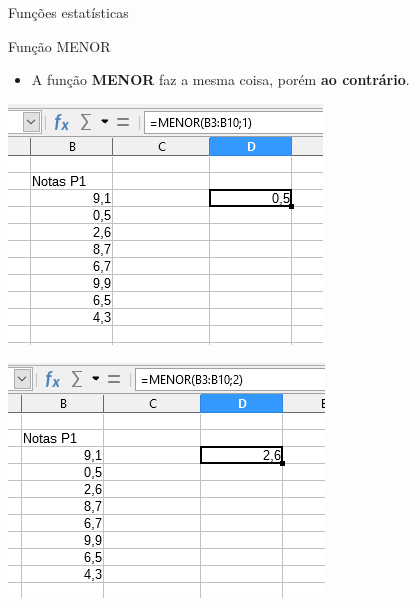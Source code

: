 \begin{frame}{Funções estatísticas}
	\begin{block}{Função MENOR}
		\begin{itemize}
			\item A função \textbf{MENOR} faz a mesma coisa, porém \textbf{ao contrário}.
		\end{itemize}
	\end{block}
	
	\bigskip
	
	\begin{minipage}{0.45\linewidth}
		\centering
		\includegraphics[width=1\linewidth]{Figuras/Ch06/fig52}
	\end{minipage}\hfill
	\begin{minipage}{0.45\linewidth}
		\centering
		\includegraphics[width=1\linewidth]{Figuras/Ch06/fig53}
	\end{minipage}
\end{frame}


